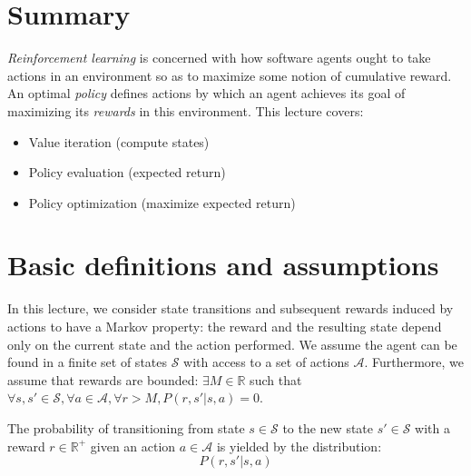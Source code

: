 \documentclass{article}
\begin{document}



\section{Summary}

\textit{Reinforcement learning} is concerned with how software agents ought to take actions in an environment so as to maximize some notion of cumulative reward. An optimal \textit{policy} defines actions by which an agent achieves its goal of maximizing its \textit{rewards} in this environment. This lecture covers:
\begin{itemize}
    \item Value iteration (compute states)
    \item Policy evaluation (expected return)
    \item Policy optimization (maximize expected return)
\end{itemize}

\section{Basic definitions and assumptions}

In this lecture, we consider state transitions and subsequent rewards induced by actions to have a Markov property: the reward and the resulting state depend only on the current state and the action performed. We assume the agent can be found in a finite set of states $\mathcal{S}$ with access to a set of actions $\mathcal{A}$. Furthermore, we assume that rewards are bounded:
$\exists M\in \mathbb{R}$ such that $\forall s,s'\in \mathcal{S}, \forall a\in \mathcal{A},\forall r > M, P(r,s'|s,a)=0$.

\begin{defn}
The probability of transitioning from state $s\in \mathcal{S}$ to the new state $s' \in \mathcal{S}$ with a reward $r\in \mathbb R^{+}$ given an action $a\in \mathcal{A}$ is yielded by the distribution:
\[
P(r,s'|s,a)
\]
\end{defn}
\end{document}
